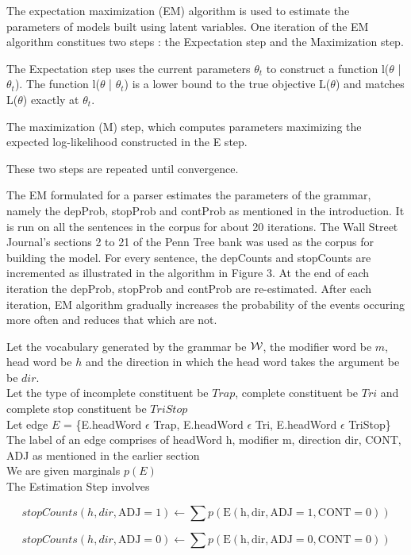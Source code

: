 \documentclass{article}
\begin{document}
The expectation maximization (EM) algorithm is used to estimate the parameters of models built using latent variables. One iteration of the EM algorithm constitues two steps : the Expectation step and the Maximization step. 

The Expectation step uses the current parameters $\theta_t$ to construct a function l($\theta$ | $\theta_t$). The function l($\theta$ | $\theta_t$) is a lower bound to the true objective L($\theta$) and matches L($\theta$) exactly at $\theta_t$.

The maximization (M) step, which computes parameters maximizing the expected log-likelihood constructed in the E step.

These two steps are repeated until convergence.

The EM formulated for a parser estimates the parameters of the grammar, namely the depProb, stopProb and contProb as mentioned in the introduction. It is run on all the sentences in the corpus for about 20 iterations. The Wall Street Journal's sections 2 to 21 of the Penn Tree bank was used as the corpus for building the model. For every sentence, the depCounts and stopCounts are incremented as illustrated in the algorithm in Figure 3. At the end of each iteration the depProb, stopProb and contProb are re-estimated. After each iteration, EM algorithm gradually increases the probability of the events occuring more often and reduces that which are not.

Let the vocabulary generated by the grammar be ${\cal W}$, the modifier word be $m$, head word be $h$ and the direction in which the head word takes the argument be be $dir$. \\
Let the type of incomplete constituent be $Trap$, complete constituent be $Tri$ and complete stop constituent be $TriStop$ \\
Let edge $E$ = \{E.headWord $\epsilon$ Trap, E.headWord $\epsilon$ Tri, E.headWord $\epsilon$ TriStop\} \\
The label of an edge comprises of headWord h, modifier m, direction dir, CONT, ADJ as mentioned in the earlier section \\
We are given marginals $p(E)$ \\

The Estimation Step involves

 \[stopCounts(h, dir, \mathrm{ADJ}= 1) \gets 
  \sum p(\mathrm{E(h, dir, ADJ=1, CONT = 0)}) \]

 \[stopCounts(h, dir, \mathrm{ADJ}= 0) \gets 
  \sum p(\mathrm{E(h, dir, ADJ=0, CONT = 0)}) \]
\end{document}
